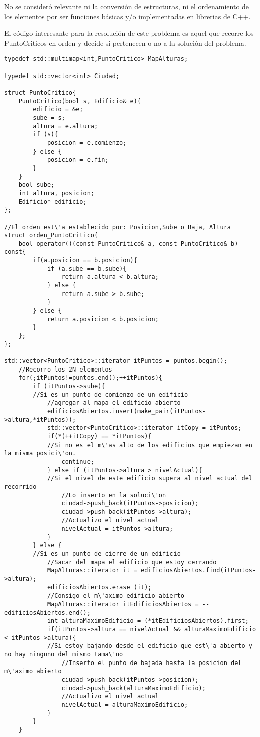 No se consideró relevante ni la conversión de estructuras, ni el ordenamiento de los elementos por ser funciones básicas y/o implementadas en librerias de C++.

El código interesante para la resolución de este problema es aquel que recorre los PuntoCriticos en orden y decide si pertenecen o no a la solución del problema.


\begin{lstlisting}
typedef std::multimap<int,PuntoCritico> MapAlturas;

typedef std::vector<int> Ciudad;

struct PuntoCritico{
	PuntoCritico(bool s, Edificio& e){
		edificio = &e;
		sube = s;
		altura = e.altura;
		if (s){
			posicion = e.comienzo;
		} else {
			posicion = e.fin;
		}
	}
	bool sube;
	int altura, posicion;
	Edificio* edificio;
};

//El orden est\'a establecido por: Posicion,Sube o Baja, Altura
struct orden_PuntoCritico{
	bool operator()(const PuntoCritico& a, const PuntoCritico& b) const{
		if(a.posicion == b.posicion){
			if (a.sube == b.sube){
				return a.altura < b.altura;
			} else {
				return a.sube > b.sube;
			}
		} else {
			return a.posicion < b.posicion;
		}
	};
};

std::vector<PuntoCritico>::iterator itPuntos = puntos.begin();
	//Recorro los 2N elementos
	for(;itPuntos!=puntos.end();++itPuntos){
		if (itPuntos->sube){
		//Si es un punto de comienzo de un edificio
			//agregar al mapa el edificio abierto
			edificiosAbiertos.insert(make_pair(itPuntos->altura,*itPuntos));
			std::vector<PuntoCritico>::iterator itCopy = itPuntos;
 			if(*(++itCopy) == *itPuntos){
 			//Si no es el m\'as alto de los edificios que empiezan en la misma posici\'on.	
				continue;
			} else if (itPuntos->altura > nivelActual){
			//Si el nivel de este edificio supera al nivel actual del recorrido
				//Lo inserto en la soluci\'on
				ciudad->push_back(itPuntos->posicion);
				ciudad->push_back(itPuntos->altura);
				//Actualizo el nivel actual
				nivelActual = itPuntos->altura;
			}
		} else {
		//Si es un punto de cierre de un edificio
			//Sacar del mapa el edificio que estoy cerrando
			MapAlturas::iterator it = edificiosAbiertos.find(itPuntos->altura);
			edificiosAbiertos.erase (it);
			//Consigo el m\'aximo edificio abierto
			MapAlturas::iterator itEdificiosAbiertos = --edificiosAbiertos.end();
			int alturaMaximoEdificio = (*itEdificiosAbiertos).first;
			if(itPuntos->altura == nivelActual && alturaMaximoEdificio < itPuntos->altura){
			//Si estoy bajando desde el edificio que est\'a abierto y no hay ninguno del mismo tama\'no
				//Inserto el punto de bajada hasta la posicion del m\'aximo abierto
				ciudad->push_back(itPuntos->posicion);
				ciudad->push_back(alturaMaximoEdificio);
				//Actualizo el nivel actual
				nivelActual = alturaMaximoEdificio;
			}
		}
	}
\end{lstlisting}